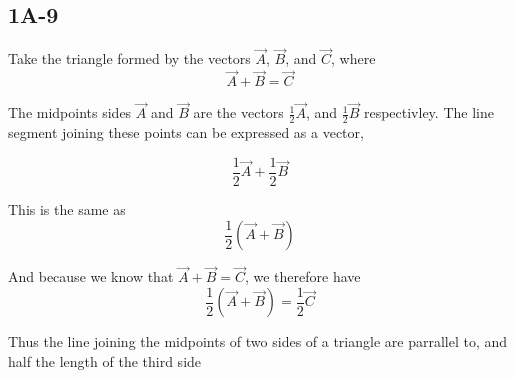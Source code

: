 \documentclass[main.tex]{subfiles}
\begin{document}
\subsection*{1A-9}

Take the triangle formed by the vectors $\vec{A}$, $\vec{B}$, and $
\vec{C}$, where
\begin{equation*}
\vec{A} + \vec{B} = \vec{C}
\end{equation*}

The midpoints sides $\vec{A}$ and $\vec{B}$ are the vectors
$\frac{1}{2}\vec{A}$, and $\frac{1}{2}\vec{B}$ respectivley.
The line segment joining these points can be expressed as a vector,

\begin{equation*}
\frac{1}{2}\vec{A} + \frac{1}{2}\vec{B}
\end{equation*}

This is the same as
\begin{equation*}
\frac{1}{2} (\vec{A} + \vec{B})
\end{equation*}

And because we know that $\vec{A} + \vec{B} = \vec{C}$, we therefore
have
\begin{equation*}
\frac{1}{2} (\vec{A} + \vec{B}) =  \frac{1}{2} \vec{C}
\end{equation*}


Thus the line joining the midpoints of two sides of a triangle are
parrallel to, and half the length of the third side
\end{document}
